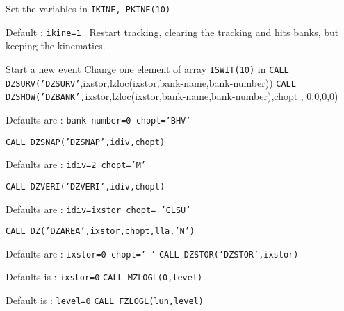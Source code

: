           
       
        
Set the variables in   {\tt IKINE, PKINE(10)}
 
Default : {\tt ikine=1 }
Restart tracking, clearing the tracking and hits
banks, but keeping the kinematics.
 
Start a new event
Change one element of array {\tt ISWIT(10)} in
{\tt CALL DZSURV('DZSURV'},ixstor,lzloc(ixstor,bank-name,bank-number))
{\tt CALL DZSHOW('DZBANK',}ixstor,lzloc(ixstor,bank-name,bank-number),chopt ,
0,0,0,0)
 
Defaults are : {\tt bank-number=0  chopt='BHV'}
 
{\tt CALL DZSNAP('DZSNAP',idiv,chopt)}
 
Defaults are : {\tt idiv=2  chopt='M'}
 
{\tt  CALL DZVERI('DZVERI',idiv,chopt)}
 
Defaults are : {\tt idiv=ixstor  chopt= 'CLSU'}
 
{\tt  CALL DZ('DZAREA',ixstor,chopt,lla,'N')}
 
Defaults are : {\tt ixstor=0  chopt=' '}
{\tt  CALL DZSTOR('DZSTOR',ixstor)}
 
Defaults is : {\tt ixstor=0}
{\tt  CALL MZLOGL(0,level)}
 
Default is : {\tt level=0}
{\tt  CALL FZLOGL(lun,level)}
 
